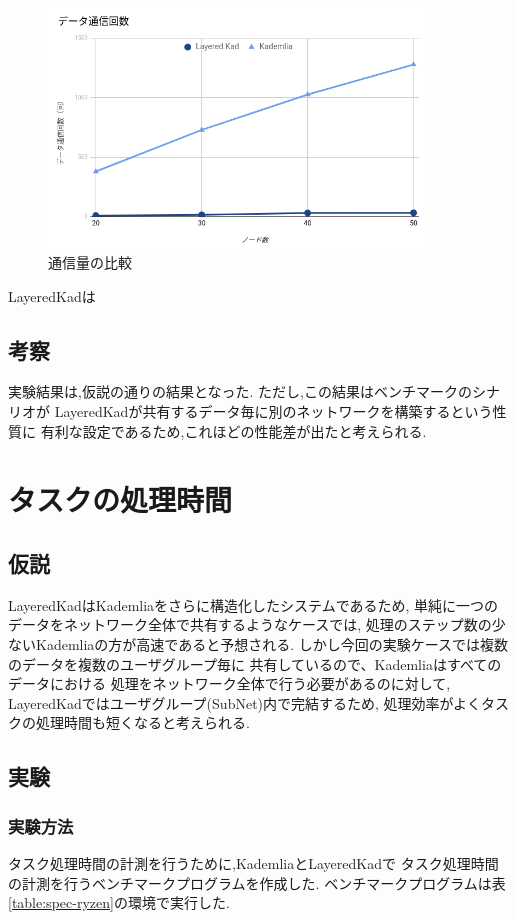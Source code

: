 \documentclass[sotsuron]{jcsie}
\begin{document}
\begin{figure}[H]	
	\centering
	\includegraphics[width=10cm]{./assets/image/traffic_graph.png}
	\caption{通信量の比較}
	\label{figure:traffic-3}
\end{figure}

LayeredKadは

\subsection{考察}
実験結果は,仮説の通りの結果となった.
ただし,この結果はベンチマークのシナリオが
LayeredKadが共有するデータ毎に別のネットワークを構築するという性質に
有利な設定であるため,これほどの性能差が出たと考えられる.

\section{タスクの処理時間}
\subsection{仮説}
LayeredKadはKademliaをさらに構造化したシステムであるため,
単純に一つのデータをネットワーク全体で共有するようなケースでは,
処理のステップ数の少ないKademliaの方が高速であると予想される.
しかし今回の実験ケースでは複数のデータを複数のユーザグループ毎に
共有しているので、Kademliaはすべてのデータにおける
処理をネットワーク全体で行う必要があるのに対して,
LayeredKadではユーザグループ(SubNet)内で完結するため,
処理効率がよくタスクの処理時間も短くなると考えられる.

\subsection{実験}
\subsubsection{実験方法}
タスク処理時間の計測を行うために,KademliaとLayeredKadで
タスク処理時間の計測を行うベンチマークプログラムを作成した.
ベンチマークプログラムは表\ref{table:spec-ryzen}の環境で実行した.
\end{document}
